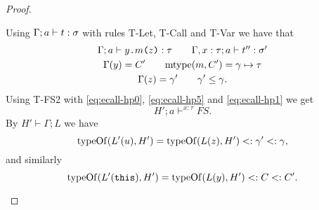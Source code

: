 \begin{proof}
\begin{description}
\begin{description}
\begin{equation}
          \end{equation}
          Using $\mbox{$\Gamma;a\vdash t:\sigma$}$ with rules {\sc T-Let, T-Call} and
          {\sc T-Var} we have that
          \begin{equation} \label{eq:ecall-hp1}
            \begin{gathered}
              \mbox{$\Gamma;a\vdash\mbox{\mdseries$y$\texttt{.}$m$\texttt{(}$z$\texttt{)}}:\tau$} \quad\quad \mbox{$\Gamma,
              x: \tau;a\vdash t'':\sigma'$} \\
              \Gamma(y) = C' \quad\quad \mbox{$\mathrm{mtype}$}(m, C') = \gamma \mapsto \tau \\
              \Gamma(z) = \gamma' \quad\quad \gamma' \leq \gamma.
            \end{gathered}
          \end{equation}
          Using {\sc T-FS2} with \eqref{eq:ecall-hp0}, \eqref{eq:ecall-hp5} and
          \eqref{eq:ecall-hp1} we get 
          \begin{equation} \label{eq:ecall-hp6}
            H';a \vdash^{x: \tau} FS.
          \end{equation}
          By $H' \vdash \Gamma;L$ we have
          \begin{equation} \label{eq:ecall-hp2}
            \mbox{$\mathrm{typeOf}$}(L'(u), H') = \mbox{$\mathrm{typeOf}$}(L(z), H') <: \gamma' <: \gamma,
          \end{equation}
          and similarly
          \begin{equation} \label{eq:ecall-hp3}
            \mbox{$\mathrm{typeOf}$}(L'(\mbox{\mdseries\texttt{this}}), H') = \mbox{$\mathrm{typeOf}$}(L(y), H') <: C <: C'.
          \end{equation}


\end{description}
\end{description}
\end{proof}
